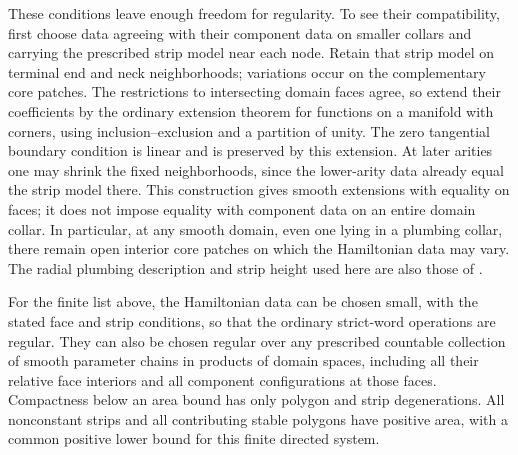 These conditions leave enough freedom for regularity.  To see their
compatibility, first choose data agreeing with their component data
on smaller collars and carrying the prescribed strip model near each
node.  Retain that strip model on terminal end and neck
neighborhoods; variations occur on the complementary core patches.
The restrictions to intersecting domain faces agree, so extend their
coefficients by the ordinary extension theorem for functions on a
manifold with corners, using inclusion--exclusion and a partition of
unity.  The zero tangential boundary condition is linear and is
preserved by this extension.  At later arities one may shrink the
fixed neighborhoods, since the lower-arity data already equal the
strip model there.  This construction gives smooth extensions with
equality on faces; it does not impose equality with component data on
an entire domain collar.  In particular, at any smooth domain, even
one lying in a plumbing collar, there remain open interior core
patches on which the Hamiltonian data may vary.  The radial
plumbing description and strip height used here are also those of
\cite[Proposition~7.5]{A8}.

\begin{lemma}
\label{comp:regularity}
For the finite list above, the Hamiltonian data can be chosen small,
with the stated face and strip conditions, so that the ordinary
strict-word operations are regular.  They can also be chosen regular
over any prescribed countable collection of smooth parameter chains
in products of domain spaces, including all their relative face
interiors and all component configurations at those faces.
Compactness below an area bound has only polygon and strip
degenerations.  All nonconstant strips and all contributing stable
polygons have positive area, with a common positive lower bound for
this finite directed system.
\end{lemma}

